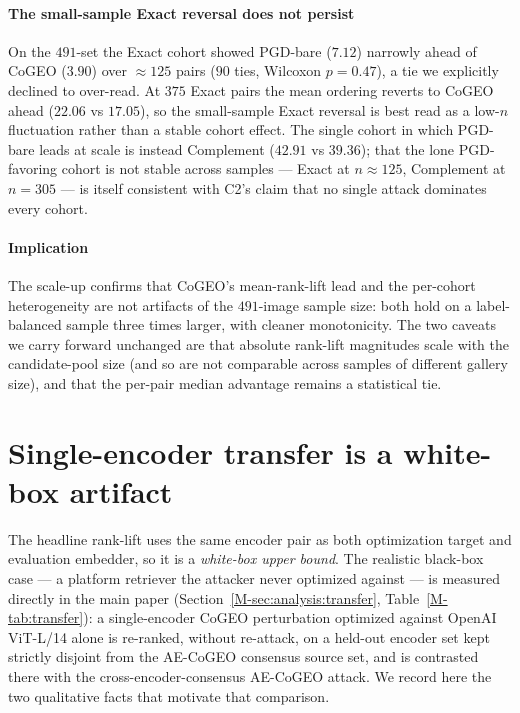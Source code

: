 \paragraph{The small-sample Exact reversal does not persist} On the $491$-set the Exact cohort showed PGD-bare ($7.12$) narrowly ahead of CoGEO ($3.90$) over $\approx 125$ pairs ($90$ ties, Wilcoxon $p = 0.47$), a tie we explicitly declined to over-read. At $375$ Exact pairs the mean ordering reverts to CoGEO ahead ($22.06$ vs $17.05$), so the small-sample Exact reversal is best read as a low-$n$ fluctuation rather than a stable cohort effect. The single cohort in which PGD-bare leads at scale is instead Complement ($42.91$ vs $39.36$); that the lone PGD-favoring cohort is not stable across samples --- Exact at $n \approx 125$, Complement at $n = 305$ --- is itself consistent with C2's claim that no single attack dominates every cohort.

\paragraph{Implication} The scale-up confirms that CoGEO's mean-rank-lift lead and the per-cohort heterogeneity are not artifacts of the $491$-image sample size: both hold on a label-balanced sample three times larger, with cleaner monotonicity. The two caveats we carry forward unchanged are that absolute rank-lift magnitudes scale with the candidate-pool size (and so are not comparable across samples of different gallery size), and that the per-pair median advantage remains a statistical tie.

\section{Single-encoder transfer is a white-box artifact}
\label{sm:transfer}

The headline rank-lift uses the same encoder pair as both optimization target and evaluation embedder, so it is a \emph{white-box upper bound}. The realistic black-box case --- a platform retriever the attacker never optimized against --- is measured directly in the main paper (Section~\ref{M-sec:analysis:transfer}, Table~\ref{M-tab:transfer}): a single-encoder CoGEO perturbation optimized against OpenAI ViT-L/14 alone is re-ranked, without re-attack, on a held-out encoder set kept strictly disjoint from the AE-CoGEO consensus source set, and is contrasted there with the cross-encoder-consensus AE-CoGEO attack. We record here the two qualitative facts that motivate that comparison.

